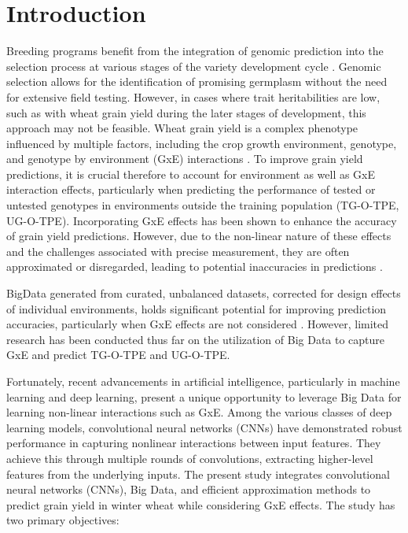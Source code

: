 \documentclass[english, biblatex]{lni}
\begin{document}
\section{Introduction}
Breeding programs benefit from the integration of genomic prediction into the selection process at various stages of the variety development cycle \cite{piepho_blup_2008}. Genomic selection allows for the identification of promising germplasm without the need for extensive field testing. However, in cases where trait heritabilities are low, such as with wheat grain yield during the later stages of development, this approach may not be feasible. Wheat grain yield is a complex phenotype influenced by multiple factors, including the crop growth environment, genotype, and genotype by environment (GxE) interactions \cite{cooper_extending_2023}. To improve grain yield predictions, it is crucial therefore to account for environment as well as GxE interaction effects, particularly when predicting the performance of tested or untested genotypes in environments outside the training population (TG-O-TPE, UG-O-TPE). Incorporating GxE effects has been shown to enhance the accuracy of grain yield predictions. However, due to the non-linear nature of these effects and the challenges associated with precise measurement, they are often approximated \cite{jarquin_reaction_2014} or disregarded, leading to potential inaccuracies in predictions \cite{crossa_genome_2022}.

BigData generated from curated, unbalanced datasets, corrected for design effects of individual environments, holds significant potential for improving prediction accuracies, particularly when GxE effects are not considered \cite{zhao2021unlocking}. However, limited research has been conducted thus far on the utilization of Big Data to capture GxE and predict TG-O-TPE and UG-O-TPE.

Fortunately, recent advancements in artificial intelligence, particularly in machine learning and deep learning, present a unique opportunity to leverage Big Data for learning non-linear interactions such as GxE. Among the various classes of deep learning models, convolutional neural networks (CNNs) have demonstrated robust performance in capturing nonlinear interactions between input features. They achieve this through multiple rounds of convolutions, extracting higher-level features from the underlying inputs. The present study integrates convolutional neural networks (CNNs), Big Data, and efficient approximation methods to predict grain yield in winter wheat while considering GxE effects. The study has two primary objectives:
\end{document}
